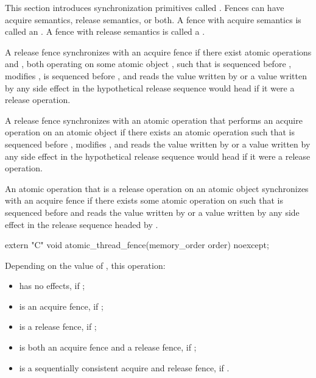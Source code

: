 \pnum
This section introduces synchronization primitives called . Fences can have
acquire semantics, release semantics, or both. A fence with acquire semantics is called
an . A fence with release semantics is called a .

\pnum
A release fence  synchronizes with an acquire fence  if there exist
atomic operations  and , both operating on some atomic object
, such that  is sequenced before ,  modifies
,  is sequenced before , and  reads the value
written by  or a value written by any side effect in the hypothetical release
sequence  would head if it were a release operation.

\pnum
A release fence  synchronizes with an atomic operation  that
performs an acquire operation on an atomic object  if there exists an atomic
operation  such that  is sequenced before , 
modifies , and  reads the value written by  or a value
written by any side effect in the hypothetical release sequence  would head if
it were a release operation.

\pnum
An atomic operation  that is a release operation on an atomic object
 synchronizes with an acquire fence  if there exists some atomic
operation  on  such that  is sequenced before 
and reads the value written by  or a value written by any side effect in the
release sequence headed by .

%
\begin{itemdecl}
extern "C" void atomic_thread_fence(memory_order order) noexcept;
\end{itemdecl}

\begin{itemdescr}
\pnum
\effects Depending on the value of , this operation:

\begin{itemize}
\item has no effects, if ;

\item is an acquire fence, if ;

\item is a release fence, if ;

\item is both an acquire fence and a release fence, if ;

\item is a sequentially consistent acquire and release fence, if .
\end{itemize}
\end{itemdescr}

